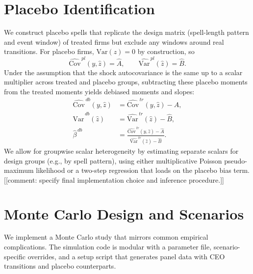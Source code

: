\documentclass[11pt,a4paper]{article}
\newcommand{\Var}{\text{Var}}
\newcommand{\Cov}{\text{Cov}}
\begin{document}
\section{Placebo Identification}

We construct placebo spells that replicate the design matrix (spell-length pattern and event window) of treated firms but exclude any windows around real transitions. For placebo firms, $\Var(z)=0$ by construction, so
\begin{equation}
 \widehat{\Cov}^{\,pl}(y,\hat z)=\hat A,\qquad \widehat{\Var}^{\,pl}(\hat z)=\hat B.
\end{equation}
Under the assumption that the shock autocovariance is the same up to a scalar multiplier across treated and placebo groups, subtracting these placebo moments from the treated moments yields debiased moments and slopes:
\begin{align}
 \widehat{\Cov}^{\,db}(y,\hat z) &= \widehat{\Cov}^{\,tr}(y,\hat z) - \hat A,\\
 \widehat{\Var}^{\,db}(\hat z) &= \widehat{\Var}^{\,tr}(\hat z) - \hat B,\\
 \hat\beta^{\,db} &= \frac{\widehat{\Cov}^{\,tr}(y,\hat z)-\hat A}{\widehat{\Var}^{\,tr}(\hat z)-\hat B}.
\end{align}
We allow for groupwise scalar heterogeneity by estimating separate scalars for design groups (e.g., by spell pattern), using either multiplicative Poisson pseudo-maximum likelihood or a two-step regression that loads on the placebo bias term. [[comment: specify final implementation choice and inference procedure.]]

\section{Monte Carlo Design and Scenarios}

We implement a Monte Carlo study that mirrors common empirical complications. The simulation code is modular with a parameter file, scenario-specific overrides, and a setup script that generates panel data with CEO transitions and placebo counterparts.
\end{document}
